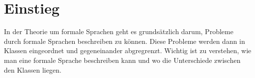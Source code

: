 \chapter{Einstieg}
In der Theorie um formale Sprachen geht es grundsätzlich darum, Probleme durch formale Sprachen beschreiben zu können. Diese Probleme werden dann in Klassen eingeordnet und gegeneinander abgregrenzt. Wichtig ist zu verstehen, wie man eine formale Sprache beschreiben kann und wo die Unterschiede zwischen den Klassen liegen.


